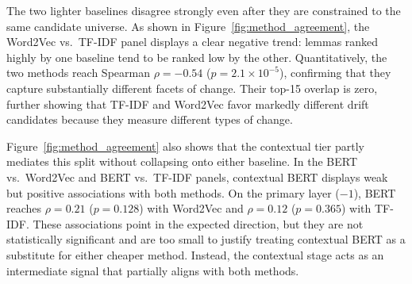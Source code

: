 \documentclass[12pt]{article}
\begin{document}
The two lighter baselines disagree strongly even after they are constrained to
the same candidate universe. As shown in Figure~\ref{fig:method_agreement}, the Word2Vec vs.\ TF-IDF panel displays a clear negative trend: lemmas ranked highly by one baseline tend to be ranked low by the other. Quantitatively, the two methods reach Spearman $\rho = -0.54$ ($p = 2.1 \times 10^{-5}$), confirming that they capture substantially different facets of change. %
Their top-15 overlap is zero, further showing that TF-IDF and Word2Vec favor markedly different drift candidates because they measure different types of change.


Figure~\ref{fig:method_agreement} also shows that the contextual tier partly mediates this split without collapsing onto either baseline. In the BERT vs.\ Word2Vec and BERT vs.\ TF-IDF panels, contextual BERT displays weak but positive associations with both methods. On the primary layer ($-1$), BERT reaches $\rho = 0.21$ ($p = 0.128$) with Word2Vec and $\rho = 0.12$ ($p = 0.365$) with TF-IDF. These associations point in the expected direction, but they are not statistically significant and are too small to justify treating contextual BERT as a substitute for either cheaper method. Instead, the contextual stage acts as an intermediate signal that partially aligns with both methods.
\end{document}
